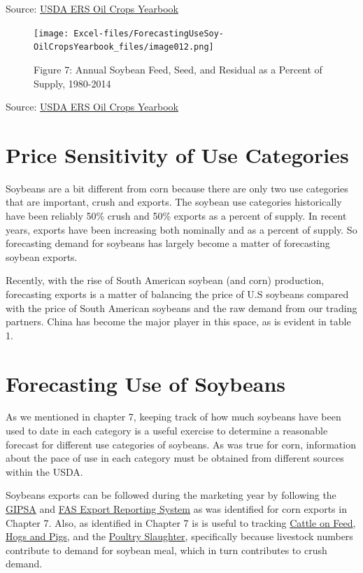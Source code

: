 \documentclass[
]{book}
\begin{document}
Source: \href{http://www.ers.usda.gov/data-products/oil-crops-yearbook.aspx}{USDA ERS Oil Crops Yearbook}

\begin{figure}
\centering
\texttt{[image: Excel-files/ForecastingUseSoy-OilCropsYearbook\_files/image012.png]}
\caption{Figure 7: Annual Soybean Feed, Seed, and Residual as a Percent of Supply, 1980-2014}
\end{figure}

Source: \href{http://www.ers.usda.gov/data-products/oil-crops-yearbook.aspx}{USDA ERS Oil Crops Yearbook}

\hypertarget{price-sensitivity-of-use-categories-1}{%
\section{Price Sensitivity of Use Categories}\label{price-sensitivity-of-use-categories-1}}

Soybeans are a bit different from corn because there are only two use categories that are important, crush and exports. The soybean use categories historically have been reliably 50\% crush and 50\% exports as a percent of supply. In recent years, exports have been increasing both nominally and as a percent of supply. So forecasting demand for soybeans has largely become a matter of forecasting soybean exports.

Recently, with the rise of South American soybean (and corn) production, forecasting exports is a matter of balancing the price of U.S soybeans compared with the price of South American soybeans and the raw demand from our trading partners. China has become the major player in this space, as is evident in table 1.

\hypertarget{forecasting-use-of-soybeans-1}{%
\section{Forecasting Use of Soybeans}\label{forecasting-use-of-soybeans-1}}

As we mentioned in chapter 7, keeping track of how much soybeans have been used to date in each category is a useful exercise to determine a reasonable forecast for different use categories of soybeans. As was true for corn, information about the pace of use in each category must be obtained from different sources within the USDA.

Soybeans exports can be followed during the marketing year by following the \href{}{GIPSA} and \href{}{FAS Export Reporting System} as was identified for corn exports in Chapter 7. Also, as identified in Chapter 7 is is useful to tracking \href{http://usda.mannlib.cornell.edu/MannUsda/viewDocumentInfo.do?documentID=1020}{Cattle on Feed}, \href{http://usda.mannlib.cornell.edu/MannUsda/viewDocumentInfo.do?documentID=1086}{Hogs and Pigs}, and the \href{https://usda.mannlib.cornell.edu/MannUsda/viewDocumentInfo.do?documentID=1131}{Poultry Slaughter}, specifically because livestock numbers contribute to demand for soybean meal, which in turn contributes to crush demand.
\end{document}
